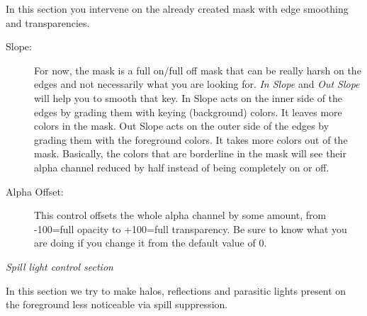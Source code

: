 In this section you intervene on the already created mask with edge smoothing and transparencies.

\begin{description}
	\item[Slope:] For now, the mask is a full on/full off mask that can be really harsh on the edges and not necessarily what you are looking for. \textit{In Slope} and \textit{Out Slope} will help you to smooth that key. In Slope acts on the inner side of the edges by grading them with keying (background) colors. It leaves more colors in the mask. Out Slope acts on the outer side of the edges by grading them with the foreground colors. It takes more colors out of the mask. Basically, the colors that are borderline in the mask will see their alpha channel reduced by half instead of being completely on or off.
	\item[Alpha Offset:] This control offsets the whole alpha channel by some amount, from -100=full opacity to +100=full transparency. Be sure to know what you are doing if you change it from the default value of $0$.
\end{description}

\qquad \textit{Spill light control section}

In this section we try to make halos, reflections and parasitic lights present on the foreground less noticeable via spill suppression.

